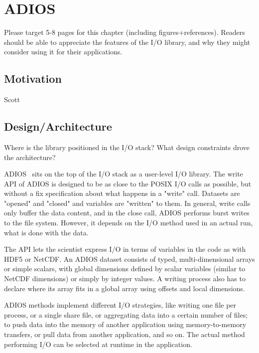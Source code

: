 
\chapter{ADIOS}
\label{part3-ch6-adios}
{\color {red}Please target 5-8 pages for this chapter (including figures+references). Readers should be able to appreciate the features of the I/O library, and why they might consider using it for their applications.}

%
%
\section{Motivation}
{\color {red}Scott}




%
%
\section{Design/Architecture}

{\color {red}Where is the library positioned in the I/O stack? What design constraints drove the architecture?}

ADIOS~\cite{ADIOS:Lofstead:ipdps09} sits on the top of the I/O stack as a user-level I/O library.
The write API of ADIOS is designed to be as close to the POSIX I/O calls as possible, but without a
fix specification about what happens in a "write" call. Datasets are "opened" and "closed" and
variables are "written" to them. In general, write calls only buffer the data content, and in the
close call, ADIOS performs burst writes to the file system. However, it depends on the I/O method
used in an actual run, what is done with the data.

The API lets the scientist express I/O in terms of variables in the code as with HDF5 or NetCDF. An
ADIOS dataset consists of typed, multi-dimensional arrays or simple scalars, with global dimensions
defined by scalar variables (similar to NetCDF dimensions) or simply by integer values. A writing
process also has to declare where its array fits in a global array using offsets and local
dimensions.

ADIOS methods implement different I/O strategies, like writing one file per process, or a single
share file, or aggregating data into a certain number of files; to push data into the memory of
another application using memory-to-memory transfers, or pull data from another application, and so
on. The actual method performing I/O can be selected at runtime in the application.

